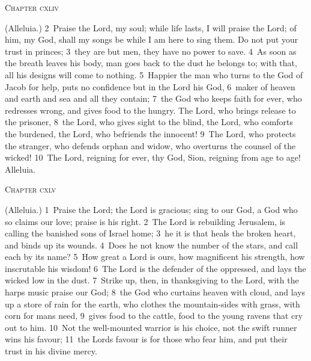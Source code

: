 \documentclass[10pt]{book} %
\begin{document}
\begin{large}\begin{center}\textsc{Chapter cxliv}\end{center}\end{large}
(Alleluia.)
\textcolor{benred8}{2}~Praise the Lord, my soul; while life lasts, I will praise the Lord; of him, my God, shall my songs be while I am here to sing them. Do not put your trust in princes; \textcolor{benred8}{3}~they are but men, they have no power to save. \textcolor{benred8}{4}~As soon as the breath leaves his body, man goes back to the dust he belongs to; with that, all his designs will come to nothing. \textcolor{benred8}{5}~Happier the man who turns to the God of Jacob for help, puts no confidence but in the Lord his God, \textcolor{benred8}{6}~maker of heaven and earth and sea and all they contain; \textcolor{benred8}{7}~the God who keeps faith for ever, who redresses wrong, and gives food to the hungry. The Lord, who brings release to the prisoner, \textcolor{benred8}{8}~the Lord, who gives sight to the blind, the Lord, who comforts the burdened, the Lord, who befriends the innocent! \textcolor{benred8}{9}~The Lord, who protects the stranger, who defends orphan and widow, who overturns the counsel of the wicked! \textcolor{benred8}{10}~The Lord, reigning for ever, thy God, Sion, reigning from age to age! Alleluia.
\begin{large}\begin{center}\textsc{Chapter cxlv}\end{center}\end{large}
(Alleluia.)
\textcolor{benred8}{1}~Praise the Lord; the Lord is gracious; sing to our God, a God who so claims our love; praise is his right. \textcolor{benred8}{2}~The Lord is rebuilding Jerusalem, is calling the banished sons of Israel home; \textcolor{benred8}{3}~he it is that heals the broken heart, and binds up its wounds. \textcolor{benred8}{4}~Does he not know the number of the stars, and call each by its name? \textcolor{benred8}{5}~How great a Lord is ours, how magnificent his strength, how inscrutable his wisdom! \textcolor{benred8}{6}~The Lord is the defender of the oppressed, and lays the wicked low in the dust. \textcolor{benred8}{7}~Strike up, then, in thanksgiving to the Lord, with the harp\textquotesingle s music praise our God; \textcolor{benred8}{8}~the God who curtains heaven with cloud, and lays up a store of rain for the earth, who clothes the mountain-sides with grass, with corn for man\textquotesingle s need, \textcolor{benred8}{9}~gives food to the cattle, food to the young ravens that cry out to him. \textcolor{benred8}{10}~Not the well-mounted warrior is his choice, not the swift runner wins his favour; \textcolor{benred8}{11}~the Lord\textquotesingle s favour is for those who fear him, and put their trust in his divine mercy.
\end{document}
